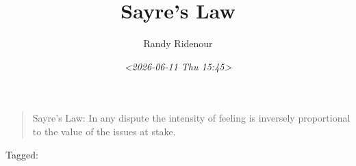 \documentclass[11pt]{article}
\author{Randy Ridenour}
\date{\textit{<2026-06-11 Thu 15:45>}}
\title{Sayre's Law}
\begin{document}
\maketitle
\begin{quote}
Sayre's Law: In any dispute the intensity of feeling is inversely proportional to the value of the issues at stake.
\end{quote}

\begin{tagline}
Tagged: 
\end{tagline}
\end{document}
